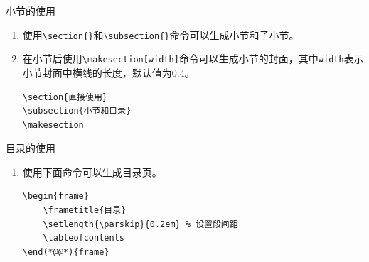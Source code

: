 \documentclass[8pt]{ctexbeamer}
\begin{document}
\begin{frame}[fragile]{\insertsection}{\insertsubsection}

    \begin{block}{小节的使用}
        \begin{enumerate}
            \item 使用\lstinline|\section{}|和\lstinline|\subsection{}|命令可以生成小节和子小节。
            \item 在小节后使用\lstinline|\makesection[width]|命令可以生成小节的封面，其中\lstinline|width|表示小节封面中横线的长度，默认值为0.4。
            \begin{lstlisting}[style=latex]
\section{直接使用}
\subsection{小节和目录}
\makesection
            \end{lstlisting}

        \end{enumerate}
    \end{block}

    \begin{block}{目录的使用}
        \begin{enumerate}
            \item 使用下面命令可以生成目录页。
            \begin{lstlisting}[style=latex]
\begin{frame}
    \frametitle{目录}
    \setlength{\parskip}{0.2em} % 设置段间距
    \tableofcontents
\end(*@@*){frame}
            \end{lstlisting}
        \end{enumerate}

    \end{block}

\end{frame}
\end{document}

